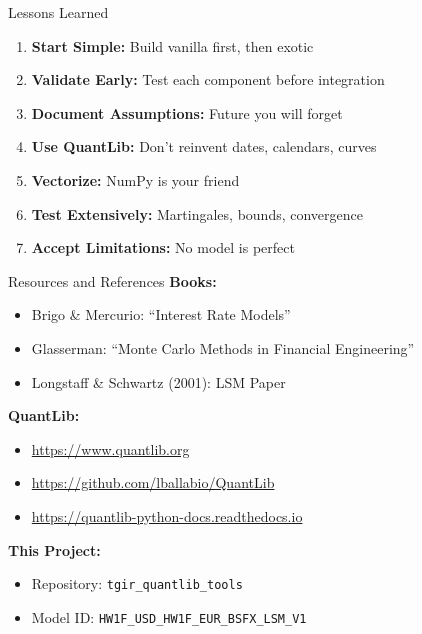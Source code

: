 \documentclass[aspectratio=169,11pt]{beamer}
\begin{document}
\begin{frame}{Lessons Learned}
\begin{enumerate}
    \item \textbf{Start Simple:} Build vanilla first, then exotic

    \item \textbf{Validate Early:} Test each component before integration

    \item \textbf{Document Assumptions:} Future you will forget

    \item \textbf{Use QuantLib:} Don't reinvent dates, calendars, curves

    \item \textbf{Vectorize:} NumPy is your friend

    \item \textbf{Test Extensively:} Martingales, bounds, convergence

    \item \textbf{Accept Limitations:} No model is perfect
\end{enumerate}
\end{frame}

\begin{frame}{Resources and References}
\textbf{Books:}
\begin{itemize}
    \item Brigo \& Mercurio: ``Interest Rate Models''
    \item Glasserman: ``Monte Carlo Methods in Financial Engineering''
    \item Longstaff \& Schwartz (2001): LSM Paper
\end{itemize}

\textbf{QuantLib:}
\begin{itemize}
    \item \url{https://www.quantlib.org}
    \item \url{https://github.com/lballabio/QuantLib}
    \item \url{https://quantlib-python-docs.readthedocs.io}
\end{itemize}

\textbf{This Project:}
\begin{itemize}
    \item Repository: \texttt{tgir\_quantlib\_tools}
    \item Model ID: \texttt{HW1F\_USD\_HW1F\_EUR\_BSFX\_LSM\_V1}
\end{itemize}
\end{frame}
\end{document}
